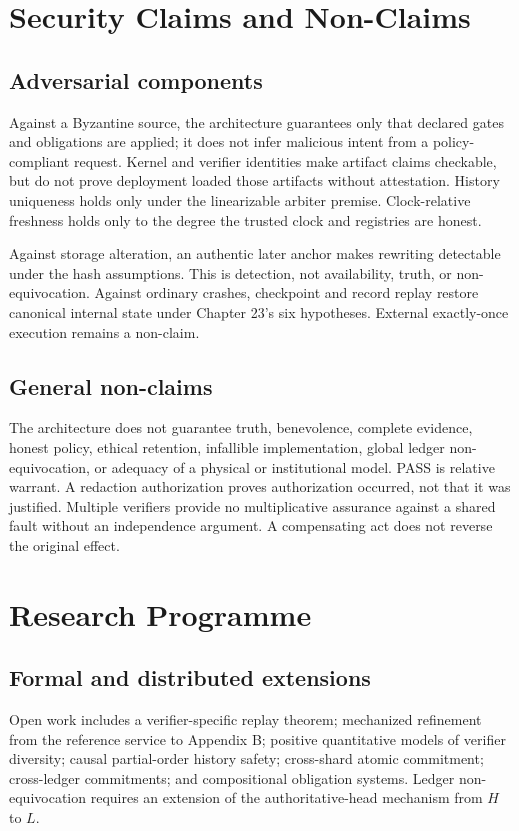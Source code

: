 \documentclass[11pt,openany]{book}
\begin{document}
\chapter{Security Claims and Non-Claims}
\section{Adversarial components}
Against a Byzantine source, the architecture guarantees only that declared
gates and obligations are applied; it does not infer malicious intent from a
policy-compliant request. Kernel and verifier identities make artifact claims
checkable, but do not prove deployment loaded those artifacts without
attestation. History uniqueness holds only under the linearizable arbiter
premise. Clock-relative freshness holds only to the degree the trusted clock
and registries are honest.

Against storage alteration, an authentic later anchor makes rewriting
detectable under the hash assumptions. This is detection, not availability,
truth, or non-equivocation. Against ordinary crashes, checkpoint and record
replay restore canonical internal state under Chapter 23's six hypotheses.
External exactly-once execution remains a non-claim.

\section{General non-claims}
The architecture does not guarantee truth, benevolence, complete evidence,
honest policy, ethical retention, infallible implementation, global ledger
non-equivocation, or adequacy of a physical or institutional model. PASS is
relative warrant. A redaction authorization proves authorization occurred, not
that it was justified. Multiple verifiers provide no multiplicative assurance
against a shared fault without an independence argument. A compensating act
does not reverse the original effect.

\chapter{Research Programme}
\section{Formal and distributed extensions}
Open work includes a verifier-specific replay theorem; mechanized refinement
from the reference service to Appendix B; positive quantitative models of
verifier diversity; causal partial-order history safety; cross-shard atomic
commitment; cross-ledger commitments; and compositional obligation systems.
Ledger non-equivocation requires an extension of the authoritative-head
mechanism from \(H\) to \(L\).
\end{document}
